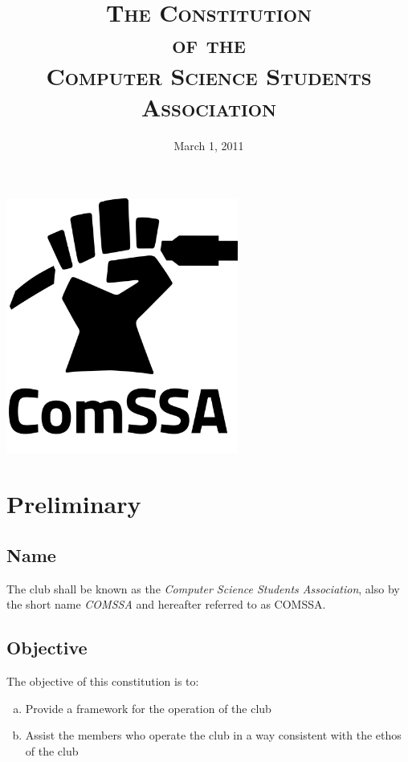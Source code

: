 \documentclass[a4paper,12pt]{article}
\title{\scshape
	The Constitution\\
	of the\\
	Computer Science Students Association
}
\date{March 1, 2011}
\author{} %
\begin{document}
\maketitle

\vspace{1in}

\begin{center}
	\includegraphics[width=3in]{logo/comssalogo_black_large.png}
\end{center}

\newpage


\section{Preliminary}

\subsection{Name}

The club shall be known as the \textit{Computer Science Students Association}, also by the short name \textit{COMSSA} and hereafter referred to as COMSSA.

\subsection{Objective}

The objective of this constitution is to:

\begin{enumerate}[a)]
	\item Provide a framework for the operation of the club
	\item Assist the members who operate the club in a way consistent with the ethos of the club
\end{enumerate}
\end{document}
